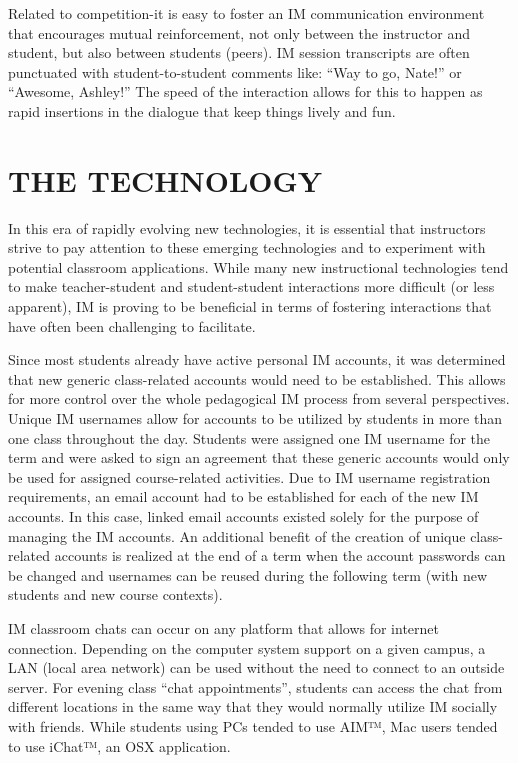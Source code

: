 \documentclass[11.5pt]{sig-alternate} %
\begin{document}
\begin{large}
Related to competition-it is easy to foster an IM communication environment that encourages mutual reinforcement, not only between the instructor and student, but also between students (peers). IM session transcripts are often punctuated with student-to-student comments like: ``Way to go, Nate!'' or ``Awesome, Ashley!'' The speed of the interaction allows for this to happen as rapid insertions in the dialogue that keep things lively and fun. 

\section*{THE TECHNOLOGY}

In this era of rapidly evolving new technologies, it is essential that instructors strive to pay attention to these emerging technologies and to experiment with potential classroom applications. While many new instructional technologies tend to make teacher-student and student-student interactions more difficult (or less apparent), IM is proving to be beneficial in terms of fostering interactions that have often been challenging to facilitate. 

Since most students already have active personal IM accounts, it was determined that new generic class-related accounts would need to be established. This allows for more control over the whole pedagogical IM process from several perspectives. Unique IM usernames allow for accounts to be utilized by students in more than one class throughout the day. Students were assigned one IM username for the term and were asked to sign an agreement that these generic accounts would only be used for assigned course-related activities. Due to IM username registration requirements, an email account had to be established for each of the new IM accounts. In this case, linked email accounts existed solely for the purpose of managing the IM accounts. An additional benefit of the creation of unique class-related accounts is realized at the end of a term when the account passwords can be changed and usernames can be reused during the following term (with new students and new course contexts). 

IM classroom chats can occur on any platform that allows for internet connection. Depending on the computer system support on a given campus, a LAN (local area network) can be used without the need to connect to an outside server. For evening class “chat appointments”, students can access the chat from different locations in the same way that they would normally utilize IM socially with friends. While students using PCs tended to use AIM™, Mac users tended to use iChat™, an OSX application. 


\end{large}
\end{document}
